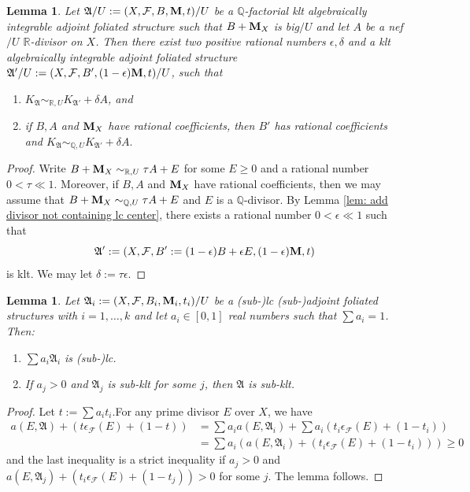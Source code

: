 \documentclass[12pt]{amsart}
\numberwithin{equation}{section}
\newcommand{\Mm}{{\bf{M}}}
\newcommand{\Rr}{\mathbb{R}}
\newcommand{\Aa}{{\mathfrak{A}}}
\newcommand{\Ff}{\mathcal{F}}
\newtheorem{lem}[thm]{Lemma}
\theoremstyle{definition}
\theoremstyle{definition}
\theoremstyle{definition}
\begin{document}
\begin{lem}\label{lem: perturbation for q-factorial klt big boundary to +ample}
Let $\Aa/U:=(X,\Ff,B,\Mm,t)/U$ be a $\mathbb Q$-factorial klt algebraically integrable adjoint foliated structure such that $B+\Mm_X$ is big$/U$ and let $A$ be a nef$/U$ $\Rr$-divisor on $X$. Then there exist two positive rational numbers $\epsilon,\delta$ and a klt algebraically integrable adjoint foliated structure $\Aa'/U:=(X,\Ff,B',(1-\epsilon)\Mm,t)/U$, such that
\begin{enumerate}
\item $K_{\Aa}\sim_{\mathbb R,U}K_{\Aa'}+\delta A$, and
\item if $B,A$ and $\Mm_X$ have rational coefficients, then $B'$ has rational coefficients and $K_{\Aa}\sim_{\mathbb Q,U}K_{\Aa'}+\delta A.$
\end{enumerate}
\end{lem}
\begin{proof}
Write $B+\Mm_X\sim_{\mathbb R,U}\tau A+E$ for some $E\geq 0$ and a rational number $0<\tau\ll 1$. Moreover, if $B,A$ and $\Mm_X$ have rational coefficients, then we may assume that $B+\Mm_X\sim_{\mathbb Q,U}\tau A+E$ and $E$ is a $\mathbb Q$-divisor. By Lemma \ref{lem: add divisor not containing lc center}, there exists a rational number $0<\epsilon\ll 1$ such that $$\Aa':=(X,\Ff,B':=(1-\epsilon)B+\epsilon E,(1-\epsilon)\Mm,t)$$ is klt. We may let $\delta:=\tau\epsilon$.
\end{proof}

\begin{lem}\label{lem: combine lc afs}
    Let $\Aa_i:=(X,\Ff,B_i,\Mm_i,t_i)/U$ be a (sub-)lc (sub-)adjoint foliated structures with $i=1,\dots,k$ and let $a_i\in [0,1]$ real numbers such that $\sum a_i=1$. Then:
    \begin{enumerate}
   \item $\sum a_i\Aa_i$ is (sub-)lc.
   \item If $a_j>0$ and $\Aa_j$ is sub-klt for some $j$, then $\Aa$ is sub-klt.
    \end{enumerate}
\end{lem}
\begin{proof}
Let $t:=\sum a_it_i$.For any prime divisor $E$ over $X$, we have
\begin{align*}
a(E,\Aa)+(t\epsilon_{\Ff}(E)+(1-t))&=\sum a_ia(E,\Aa_i)+\sum a_i(t_i\epsilon_{\Ff}(E)+(1-t_i))\\
&=\sum a_i\left(a(E,\Aa_i)+(t_i\epsilon_{\Ff}(E)+(1-t_i))\right)\geq 0
\end{align*}
and the last inequality is a strict inequality if $a_j>0$ and $a(E,\Aa_j)+(t_i\epsilon_{\Ff}(E)+(1-t_j))>0$ for some $j$. The lemma follows.
\end{proof}
\end{document}
